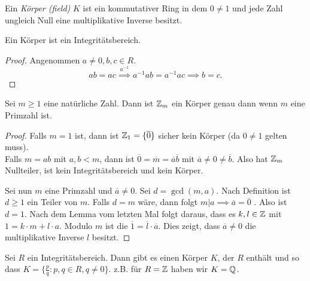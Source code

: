 \begin{definition}
	Ein \emph{Körper (field)} $K$ ist ein kommutativer Ring in dem $0 \neq 1$ und jede Zahl ungleich Null eine multiplikative Inverse besitzt.
\end{definition}

\begin{lemma}
	Ein Körper ist ein Integritätsbereich.
\end{lemma}

\begin{proof}
	Angenommen $a \neq  0, b,c \in R$.
	\[
	ab = ac \stackrel{a^{-1}}{\implies} a^{-1} a b = a^{-1} a c \implies b = c
	.\] 
\end{proof}

\begin{proposition}
	Sei $m \geq 1$ eine natürliche Zahl.
	Dann ist $\mathbb{Z}_{m}$ ein Körper genau dann wenn $m$ eine Primzahl ist.
\end{proposition}

\begin{proof}
	Falls $m=1$ ist, dann ist $\mathbb{Z}_{1} = \{\overline{0}\}$ sicher kein Körper (da $0 \neq 1$ gelten muss).\\
	Falls $m = ab$ mit $a,b < m$, dann ist $\overline{0} = \overline{m} = \overline{a} \overline{b}$ mit $\overline{a} \neq 0 \neq \overline{b}$.
	Also hat $\mathbb{Z}_{m}$ Nullteiler, ist kein Integritätsbereich und kein Körper.

	Sei nun $m$ eine Primzahl und $\overline{a} \neq 0$. Sei $d = \gcd(m,a)$.
	Nach Definition ist $d \geq 1$ ein Teiler von $m$.
	Falls $d = m$ wäre, dann folgt $m \vert a \implies \overline{a} = \overline{0}$ \contra.
	Also ist $d = 1$. Nach dem Lemma vom letzten Mal folgt daraus, 
	dass es $k,l \in \mathbb{Z}$ mit $1 = k \cdot m + l \cdot a$. Modulo $m$ ist die $\overline{1} = \overline{l} \cdot \overline{a}$.
	Dies zeigt, dass $\overline{a} \neq 0$ die multiplikative Inverse $l$ besitzt.
\end{proof}

\begin{theorem}[Quotientenkörper (S.38)]
	Sei $R$ ein Integritätsbereich. Dann gibt es einen Körper $K$, der $R$ enthält und so dass $K = \{\frac{p}{q}: p,q \in R , q \neq 0\}$.
	z.B. für $R = \mathbb{Z}$ haben wir $K = \mathbb{Q}$.
\end{theorem}

